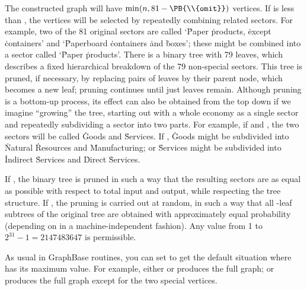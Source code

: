 The constructed graph will have $\min(n,81-\PB{\\{omit}})$ vertices. If  is less
than , the  vertices will be selected by
repeatedly combining
related sectors. For example, two of the 81 original sectors are called
`\.{Paper} \.{products,} \.{except} \.{containers}' and
`\.{Paperboard} \.{containers} \.{and} \.{boxes}'; these might be combined
into a sector called `\.{Paper} \.{products}'. There is a binary tree
with 79 leaves, which describes a fixed hierarchical breakdown of the
79 non-special sectors. This tree is
pruned, if necessary, by replacing pairs of leaves by their parent node,
which becomes a new leaf; pruning continues
until just  leaves remain. Although pruning is a bottom-up process, its
effect can also be obtained from the top down if we imagine ``growing''
the tree, starting out with a whole economy as a single sector and
repeatedly subdividing a sector into two parts. For example,
if  and , the two sectors will
be called \.{Goods} and \.{Services}. If , \.{Goods} might be
subdivided into \.{Natural} \.{Resources} and \.{Manufacturing}; or
\.{Services} might be subdivided into \.{Indirect} \.{Services} and
\.{Direct} \.{Services}.

If , the binary tree is pruned in such a way that the %
resulting sectors are as equal as possible with respect to total
input and output, while respecting the tree structure. If ,
the pruning is carried out at random, in such a way that all -leaf
subtrees of the original tree are obtained with approximately equal
probability (depending on  in a machine-independent fashion).
Any  value from 1 to $2^{31}-1=2147483647$ is permissible.

As usual in GraphBase routines, you can set  to get the
default
situation where  has its maximum value. For example, either
 or  produces the full graph;
 or  produces the full graph except
for the two special vertices.

